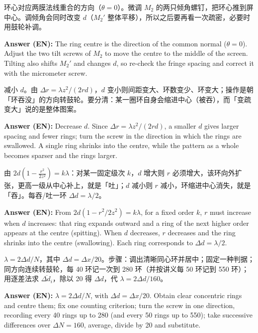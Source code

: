 \documentclass[11pt]{ctexart}
\begin{document}
环心对应两膜法线重合的方向（\(\theta=0\)）。微调 \(M_2\) 的两只倾角螺钉，把环心推到屏中心。调倾角会同时改变 \(d\)（\(M_2'\) 整体平移），所以之后要再看一次疏密，必要时用鼓轮补调。

\textbf{Answer (EN):} The ring centre is the direction of the common normal ($\theta=0$). Adjust the two tilt screws of $M_2$ to move the centre to the middle of the screen. Tilting also shifts $M_2'$ and changes $d$, so re-check the fringe spacing and correct it with the micrometer screw.


减小 \(d\)。由 \(\Delta r=\lambda z^2/(2rd)\)，\(d\) 变小则间距变大、环数变少、环变大；操作是朝「环吞没」的方向转鼓轮。要分清：某一圈环自身会缩进中心（被吞），而「变疏变大」说的是整体图案。

\textbf{Answer (EN):} Decrease $d$. Since $\Delta r=\lambda z^{2}/(2rd)$, a smaller $d$ gives larger spacing and fewer rings; turn the screw in the direction in which the rings are swallowed. A single ring shrinks into the centre, while the pattern as a whole becomes sparser and the rings larger.


由 \(2d\left(1-\frac{r^2}{2z^2}\right)=k\lambda\)：对某一固定级次 \(k\)，\(d\) 增大则 \(r\) 必须增大，该环向外扩张，更高一级从中心补上，就是「吐」；\(d\) 减小则 \(r\) 减小，环缩进中心消失，就是「吞」。每吞/吐一环 \(\Delta d=\lambda/2\)。

\textbf{Answer (EN):} From $2d(1-r^{2}/2z^{2})=k\lambda$, for a fixed order $k$, $r$ must increase when $d$ increases: that ring expands outward and a ring of the next higher order appears at the centre (spitting). When $d$ decreases, $r$ decreases and the ring shrinks into the centre (swallowing). Each ring corresponds to $\Delta d=\lambda/2$.


\(\lambda=2\Delta d/N\)，其中 \(\Delta d=\Delta x/20\)。步骤：调出清晰同心环并居中；固定一种判据；同方向连续转鼓轮，每 40 环记一次到 280 环（并按讲义每 50 环记到 550 环）；用逐差法求 \(\overline{\Delta d_i}\)，除以 20 得 \(\Delta d\)，代 \(\lambda=2\Delta d/160\)。

\textbf{Answer (EN):} $\lambda=2\Delta d/N$, with $\Delta d=\Delta x/20$. Obtain clear concentric rings and centre them; fix one counting criterion; turn the screw in one direction, recording every 40 rings up to 280 (and every 50 rings up to 550); take successive differences over $\Delta N=160$, average, divide by 20 and substitute.
\end{document}
